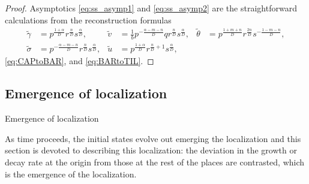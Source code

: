 \documentclass[a4paper,11pt]{article}
\def\tg{{\tilde{\gamma}}}
\def\tv{{\tilde{v}}}
\def\tth{{\tilde{\theta}}}
\def\ts{{\tilde{\sigma}}}
\def\tu{{\tilde{u}}}
\theoremstyle{remark}
\begin{document}
\begin{proof}
Asymptotics \eqref{eq:ss_asymp1} and \eqref{eq:ss_asymp2} are the straightforward calculations from the reconstruction formulas
\begin{align*}
 \tg&=p^{\frac{1+\alpha}{D}}r^{\frac{n}{D}}s^{\frac{\alpha}{D}}, & \tv &= \frac{1}{b} p^{-\frac{\alpha-m-n}{D}}qr^{\frac{n}{D}}s^{\frac{\alpha}{D}}, & \tth&=p^{\frac{1+m+n}{D}}r^{\frac{2n}{D}}s^{-\frac{1-m-n}{D}}, \\ \ts&=p^{-\frac{\alpha-m-n}{D}}r^{\frac{n}{D}}s^{\frac{\alpha}{D}},  & \tu&=p^{\frac{1+\alpha}{D}}r^{\frac{n}{D}+1}s^{\frac{\alpha}{D}},
\end{align*}
\eqref{eq:CAPtoBAR}, and \eqref{eq:BARtoTIL}.
%
%
%
\end{proof}

\subsection{Emergence of localization}
Emergence of localization 

As time proceeds, the initial states evolve out emerging the localization and this section is devoted to describing this localization: the deviation in the growth or decay rate at the origin from those at the rest of the places are contrasted, which is the emergence of the localization.
\end{document}
